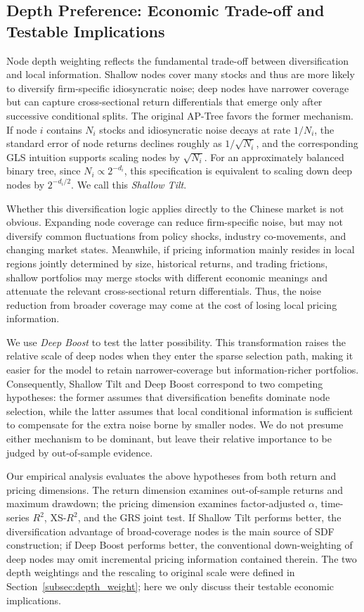 \documentclass[12pt]{article}
\begin{document}
\subsection{Depth Preference: Economic Trade-off and Testable Implications}
\label{subsec:depth_weight_hypothesis}

Node depth weighting reflects the fundamental trade-off between diversification and local information. Shallow nodes cover many stocks and thus are more likely to diversify firm-specific idiosyncratic noise; deep nodes have narrower coverage but can capture cross-sectional return differentials that emerge only after successive conditional splits. The original AP-Tree favors the former mechanism. If node \(i\) contains \(N_i\) stocks and idiosyncratic noise decays at rate \(1/N_i\), the standard error of node returns declines roughly as \(1/\sqrt{N_i}\), and the corresponding GLS intuition supports scaling nodes by \(\sqrt{N_i}\). For an approximately balanced binary tree, since \(N_i\propto 2^{-d_i}\), this specification is equivalent to scaling down deep nodes by \(2^{-d_i/2}\). We call this \emph{Shallow Tilt}.

Whether this diversification logic applies directly to the Chinese market is not obvious. Expanding node coverage can reduce firm-specific noise, but may not diversify common fluctuations from policy shocks, industry co-movements, and changing market states. Meanwhile, if pricing information mainly resides in local regions jointly determined by size, historical returns, and trading frictions, shallow portfolios may merge stocks with different economic meanings and attenuate the relevant cross-sectional return differentials. Thus, the noise reduction from broader coverage may come at the cost of losing local pricing information.

We use \emph{Deep Boost} to test the latter possibility. This transformation raises the relative scale of deep nodes when they enter the sparse selection path, making it easier for the model to retain narrower-coverage but information-richer portfolios. Consequently, Shallow Tilt and Deep Boost correspond to two competing hypotheses: the former assumes that diversification benefits dominate node selection, while the latter assumes that local conditional information is sufficient to compensate for the extra noise borne by smaller nodes. We do not presume either mechanism to be dominant, but leave their relative importance to be judged by out-of-sample evidence.

Our empirical analysis evaluates the above hypotheses from both return and pricing dimensions. The return dimension examines out-of-sample returns and maximum drawdown; the pricing dimension examines factor-adjusted \(\alpha\), time-series \(R^2\), XS-\(R^2\), and the GRS joint test. If Shallow Tilt performs better, the diversification advantage of broad-coverage nodes is the main source of SDF construction; if Deep Boost performs better, the conventional down-weighting of deep nodes may omit incremental pricing information contained therein. The two depth weightings and the rescaling to original scale were defined in Section~\ref{subsec:depth_weight}; here we only discuss their testable economic implications.
\end{document}
